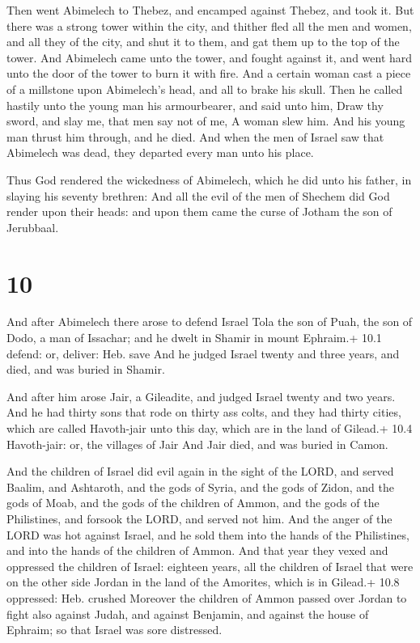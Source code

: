  Then went Abimelech to Thebez, and encamped against
Thebez, and took it.  But there was a strong tower within
the city, and thither fled all the men and women, and all they of the
city, and shut it to them, and gat them up to the top of the tower.
 And Abimelech came unto the tower, and fought against it,
and went hard unto the door of the tower to burn it with fire.
 And a certain woman cast a piece of a millstone upon
Abimelech's head, and all to brake his skull.  Then he
called hastily unto the young man his armourbearer, and said unto him,
Draw thy sword, and slay me, that men say not of me, A woman slew him.
And his young man thrust him through, and he died.  And
when the men of Israel saw that Abimelech was dead, they departed every
man unto his place.

 Thus God rendered the wickedness of Abimelech, which he
did unto his father, in slaying his seventy brethren:  And
all the evil of the men of Shechem did God render upon their heads: and
upon them came the curse of Jotham the son of Jerubbaal.

\hypertarget{section-9}{%
\section{10}\label{section-9}}

 And after Abimelech there arose to defend Israel Tola the
son of Puah, the son of Dodo, a man of Issachar; and he dwelt in Shamir
in mount Ephraim.+ 10.1 defend: or, deliver: Heb. save  And
he judged Israel twenty and three years, and died, and was buried in
Shamir.

 And after him arose Jair, a Gileadite, and judged Israel
twenty and two years.  And he had thirty sons that rode on
thirty ass colts, and they had thirty cities, which are called
Havoth-jair unto this day, which are in the land of Gilead.+ 10.4
Havoth-jair: or, the villages of Jair  And Jair died, and
was buried in Camon.

 And the children of Israel did evil again in the sight of
the LORD, and served Baalim, and Ashtaroth, and the gods of Syria, and
the gods of Zidon, and the gods of Moab, and the gods of the children of
Ammon, and the gods of the Philistines, and forsook the LORD, and served
not him.  And the anger of the LORD was hot against Israel,
and he sold them into the hands of the Philistines, and into the hands
of the children of Ammon.  And that year they vexed and
oppressed the children of Israel: eighteen years, all the children of
Israel that were on the other side Jordan in the land of the Amorites,
which is in Gilead.+ 10.8 oppressed: Heb. crushed  Moreover
the children of Ammon passed over Jordan to fight also against Judah,
and against Benjamin, and against the house of Ephraim; so that Israel
was sore distressed.

